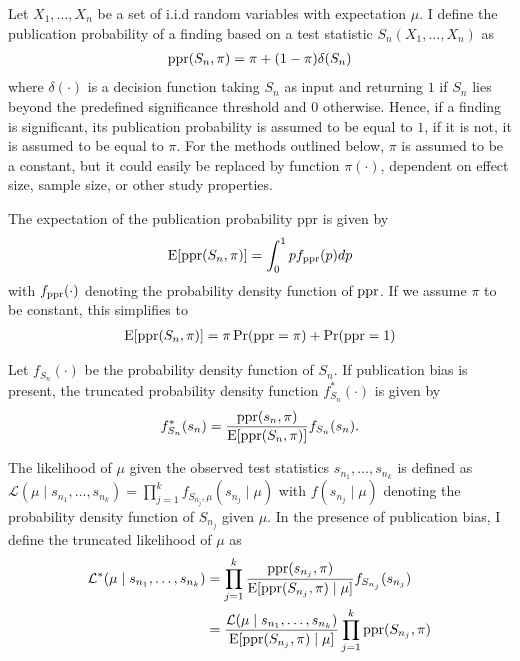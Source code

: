 \begin{description}[leftmargin=!,labelwidth=\widthof{\bfseries $\boldsymbol{E_4}$}]
    \item [\textbf{Publication rate:}] Let $X_1,\dots,X_n$ be a set of i.i.d random variables with expectation $\mu$. I define the publication probability of a finding based on a test statistic $S_n(X_1,\dots,X_n)$ as
\begin{align}
    {\operatorname{\text{ppr}}(S_n, \pi) = \pi + (1-\pi)\delta(S_n)} \label{eq:pub_prob}
\end{align}
where $\delta(\cdot)$ is a decision function taking $S_n$ as input and returning $1$ if $S_n$ lies beyond the predefined significance threshold and $0$ otherwise. Hence, if a finding is significant, its publication probability is assumed to be equal to $1$, if it is not, it is assumed to be equal to $\pi$. For the methods outlined below, $\pi$ is assumed to be a constant, but it could easily be replaced by function $\pi(\cdot)$, dependent on effect size, sample size, or other study properties.\\
\item [\textbf{Expected publication probability given $\boldsymbol{n}$:}] The expectation of the publication probability $\text{ppr}$ is given by
\begin{align}
    \operatorname{\text{E}}[\operatorname{\text{ppr}}(S_n, \pi)] = \int_0^1 p f_{\operatorname{\text{ppr}}}(p)dp \label{eq:expected_pub_prob}
\end{align}
with $f_{\operatorname{\text{ppr}}}(\cdot)$ denoting the probability density function of $\operatorname{\text{ppr}}$. If we assume $\pi$ to be constant, this simplifies to
\begin{align}
    \operatorname{\text{E}}[\operatorname{\text{ppr}}(S_n, \pi)] = \pi \Pr(\operatorname{\text{ppr}} = \pi) + \Pr(\operatorname{\text{ppr}} = 1) \label{eq:expected_pub_prob_constant}
\end{align}
\item [\textbf{Truncated probability density function of $\boldsymbol{S_n}$:}] Let $f_{S_n}(\cdot)$ be the probability density function of $S_n$. If publication bias is present, the truncated probability density function $ f_{S_n}^{*}(\cdot)$ is given by
\begin{align}
    f_{S_n}^{*}(s_n) = \frac{\operatorname{\text{ppr}}(s_n, \pi)}{\operatorname{\text{E}}[\operatorname{\text{ppr}}(S_n, \pi)]}f_{S_n}(s_n). \label{eq:truncated_prob_density}
\end{align}
\item [\textbf{Truncated likelihood of $\boldsymbol{\mu}$:}] The likelihood of $\mu$ given the observed test statistics $s_{n_1},\dots,s_{n_k}$ is defined as ${\mathcal{L}(\mu \mid s_{n_1},\dots,s_{n_k}) = \prod_{j=1}^k f_{S_{n_j},\mu}(
s_{n_j} \mid \mu)}$ with $f(s_{n_j} \mid \mu)$ denoting the probability density function of $S_{n_j}$ given $\mu$. In the presence of publication bias, I define the truncated likelihood of $\mu$ as
    \begin{align}
        \mathcal{L}^{*}(\mu \mid s_{n_1},\dots,s_{n_k}) &= \prod_{j=1}^k\frac{\operatorname{\text{ppr}}(s_{n_j}, \pi)}{\operatorname{\text{E}}[\operatorname{\text{ppr}}(S_{n_j}, \pi)\mid \mu]}f_{S_{n_j}}(s_{n_j})\\ \nonumber
        &=  \frac{\mathcal{L}(\mu \mid s_{n_1},\dots,s_{n_k})}{\operatorname{\text{E}}[\operatorname{\text{ppr}}(S_{n_j},\pi)\mid \mu]}\prod_{j=1}^k \operatorname{\text{ppr}}(S_{n_j},\pi) \label{eq:truncated_likelihood}
    \end{align}
\end{description}
